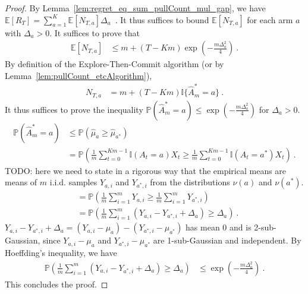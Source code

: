\begin{proof}
By Lemma~\ref{lem:regret_eq_sum_pullCount_mul_gap}, we have $\mathbb{E}[R_T] = \sum_{a=1}^K \mathbb{E}\left[N_{T,a}\right] \Delta_a$~.
It thus suffices to bound $\mathbb{E}[N_{T,a}]$ for each arm $a$ with $\Delta_a > 0$.
It suffices to prove that
\begin{align*}
  \mathbb{E}[N_{T,a}]
  &\le m + (T - Km) \exp\left(- \frac{m \Delta_a^2}{4}\right)
  \: .
\end{align*}
By definition of the Explore-Then-Commit algorithm (or by Lemma~\ref{lem:pullCount_etcAlgorithm}),
\begin{align*}
  N_{T,a}
  &= m + (T - Km) \mathbb{I}\{\hat{A}_m^* = a\}
  \: .
\end{align*}
It thus suffices to prove the inequality $\mathbb{P}(\hat{A}_m^* = a) \le \exp\left(- \frac{m \Delta_a^2}{4}\right)$ for $\Delta_a > 0$.
\begin{align*}
  \mathbb{P}(\hat{A}_m^* = a)
  &\le \mathbb{P}(\hat{\mu}_a \ge \hat{\mu}_{a^*})
  \\
  &= \mathbb{P}\left(\frac{1}{m} \sum_{t=0}^{Km-1} \mathbb{I}(A_t = a) X_t \ge \frac{1}{m} \sum_{t=0}^{Km-1} \mathbb{I}(A_t = a^*) X_t\right)
  \: .
\end{align*}
TODO: here we need to state in a rigorous way that the empirical means are means of $m$ i.i.d. samples $Y_{a,i}$ and $Y_{a^*,i}$ from the distributions $\nu(a)$ and $\nu(a^*)$.
\begin{align*}
  &= \mathbb{P}\left(\frac{1}{m} \sum_{i=1}^m Y_{a,i} \ge \frac{1}{m} \sum_{i=1}^m Y_{a^*,i}\right)
  \\
  &= \mathbb{P}\left(\frac{1}{m} \sum_{i=1}^m (Y_{a,i} - Y_{a^*,i} + \Delta_a) \ge \Delta_a\right)
  \: .
\end{align*}
$Y_{a,i} - Y_{a^*,i} + \Delta_a = (Y_{a,i} - \mu_a) - (Y_{a^*,i} - \mu_{a^*})$ has mean 0 and is 2-sub-Gaussian, since $Y_{a,i}-\mu_a$ and $Y_{a^*,i} - \mu_{a^*}$ are 1-sub-Gaussian and independent.
By Hoeffding's inequality, we have
\begin{align*}
  \mathbb{P}\left(\frac{1}{m} \sum_{i=1}^m (Y_{a,i} - Y_{a^*,i} + \Delta_a) \ge \Delta_a\right)
  &\le \exp\left(- \frac{m \Delta_a^2}{4}\right)
  \: .
\end{align*}
This concludes the proof.
\end{proof}
